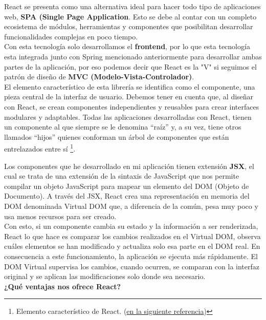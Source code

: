 React se presenta como una alternativa ideal para hacer todo tipo de aplicaciones web, \textbf{SPA (Single Page Application}. Esto se debe al contar con un completo ecosistema de módulos, herramientas y componentes que posibilitan desarrollar funcionalidades complejas en poco tiempo.\\

Con esta tecnología solo desarrollamos el \textbf{frontend}, por lo que esta tecnología esta integrada junto con Spring mencionado anteriormente para desarrollar ambas partes de la aplicación, por eso podemos decir que React es la "V" si seguimos el patrón de diseño de \textbf{MVC (Modelo-Vista-Controlador)}. \\

El elemento característico de esta librería se identifica como el componente, una pieza central de la interfaz de usuario. Debemos tener en cuenta que, al diseñar con React, se crean componentes independientes y reusables para crear interfaces modulares y adaptables. Todas las aplicaciones desarrolladas con React, tienen un componente al que siempre se le denomina “raíz” y, a su vez, tiene otros llamados “hijos” quienes conforman un árbol de componentes que están entrelazados entre sí \footnote{Elemento característico de React. (\href{https://www.coderhouse.es/blog/que-es-react-js}{en la siguiente referencia})}.\cite{react}

\newpage

Los componentes que he desarrollado en mi aplicación tienen extensión \textbf{JSX}, el cual se trata de una extensión de la sintaxis de JavaScript que nos permite compilar un objeto JavaScript para mapear un elemento del DOM (Objeto de Documento). A través del JSX, React crea una representación en memoria del DOM denominada Virtual DOM que, a diferencia de la común, pesa muy poco y usa menos recursos para ser creado. \\

Con esto, si un componente cambia su estado y la información a ser renderizada, React lo que hace es comparar los cambios realizados en el Virtual DOM, observa cuáles elementos se han modificado y actualiza solo esa parte en el DOM real. En consecuencia a este funcionamiento, la aplicación se ejecuta más rápidamente. El DOM Virtual supervisa los cambios, cuando ocurren, se comparan con la interfaz original y se aplican las modificaciones solo donde sea necesario. \\

\textbf{¿Qué ventajas nos ofrece React?}

